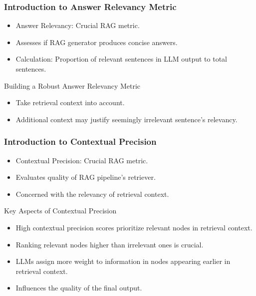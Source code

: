 \begin{frame}[fragile]\frametitle{Introduction to Answer Relevancy Metric}
  \begin{itemize}
    \item Answer Relevancy: Crucial RAG metric.
    \item Assesses if RAG generator produces concise answers.
    \item Calculation: Proportion of relevant sentences in LLM output to total sentences.
  \end{itemize}
  
Building a Robust Answer Relevancy Metric
  \begin{itemize}
    \item Take retrieval context into account.
    \item Additional context may justify seemingly irrelevant sentence's relevancy.
  \end{itemize}
\end{frame}

\begin{frame}[fragile]\frametitle{Introduction to Contextual Precision}
  \begin{itemize}
    \item Contextual Precision: Crucial RAG metric.
    \item Evaluates quality of RAG pipeline's retriever.
    \item Concerned with the relevancy of retrieval context.
  \end{itemize}
Key Aspects of Contextual Precision
  \begin{itemize}
    \item High contextual precision scores prioritize relevant nodes in retrieval context.
    \item Ranking relevant nodes higher than irrelevant ones is crucial.
    \item LLMs assign more weight to information in nodes appearing earlier in retrieval context.
    \item Influences the quality of the final output.
  \end{itemize}
\end{frame}

